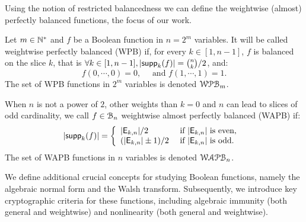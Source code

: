 \documentclass[11pt]{llncs}
\begin{document}

Using the notion of restricted balancedness we can define the weightwise (almost) perfectly balanced functions, the focus of our work.

\begin{definition}\label{def:WAPB}
	Let $m\in \mathbb{N}^*$ and $f$ be a Boolean function in $n=2^m$ variables. It will be called weightwise perfectly balanced (WPB) if, for every $k\in[1,n-1]$, $f$ is balanced on the slice $k$, that is $\forall k \in [1,n-1], |\mathsf{supp}_{k}(f)|=\binom{n}{k}/2$, and:
	\[f(0,\cdots,0)=0,\quad \text{ and } f(1,\cdots,1)=1.\]	
	The set of WPB functions in $2^m$ variables is denoted $\mathcal{WPB}_{m}$.
	
	When $n$ is not a power of $2$, other weights than $k=0$ and $n$ can lead to slices of odd cardinality, we call $f\in \mathcal{B}_{n}$ weightwise almost perfectly balanced (WAPB) if: 
	\[|\mathsf{supp}_{k}(f)|= \left \{
	\begin{array}{l l}
	|\mathsf{E}_{k,n}|/2  & \text{ if } |\mathsf{E}_{k,n}| \text{ is even, } \\
	(|\mathsf{E}_{k,n}|\pm 1)/2  & \text{ if }  |\mathsf{E}_{k,n}| \text{ is odd.}
	\end{array}\right.\]
	The set of WAPB functions in $n$ variables is denoted $\mathcal{WAPB}_{n}$.		
\end{definition}



We define additional crucial concepts for studying Boolean functions, namely the algebraic normal form and the Walsh transform. 
Subsequently, we introduce key cryptographic criteria for these functions, including algebraic immunity (both general and weightwise) and nonlinearity (both general and weightwise).
\end{document}

